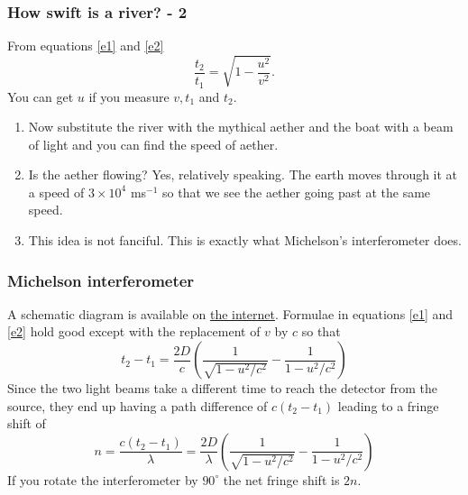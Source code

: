\documentclass{beamer}
\begin{document}
\begin{frame}
\frametitle{How swift is a river? - 2}
From equations \eqref{e1} and \eqref{e2}
\begin{equation}\label{e3}
\frac{t_2}{t_1} = \sqrt{1 - \frac{u^2}{v^2}}.
\end{equation}
You can get $u$ if you measure $v, t_1$ and $t_2$. 
\begin{enumerate}
\item Now substitute the river with the mythical aether and the boat with a 
beam of light and you can find the speed of aether.
\item Is the aether flowing? Yes, relatively speaking. The earth moves through
it at a speed of $3 \times 10^4$ ms${}^{-1}$ so that we see the aether going
past at the same speed.
\item This idea is not fanciful. This is exactly what Michelson's interferometer
does.
\end{enumerate}
\end{frame}

\begin{frame}
\frametitle{Michelson interferometer}
A schematic diagram is available on 
\href{https://en.wikipedia.org/wiki/Michelson_interferometer}{the internet}.
Formulae in equations \eqref{e1} and \eqref{e2} hold good except with the 
replacement of $v$ by $c$ so that
\begin{equation}\label{e4}
t_2 - t_1 = \frac{2D}{c}\left(\frac{1}{\sqrt{1 - u^2/c^2}} - 
                              \frac{1}{1-u^2/c^2}\right)
\end{equation}
Since the two light beams take a different time to reach the detector from the
source, they end up having a path difference of $c(t_2 - t_1)$ leading to a 
fringe shift of 
\begin{equation}\label{e5}
n = \frac{c(t_2 - t_1)}{\lambda} = 
  \frac{2D}{\lambda}\left(\frac{1}{\sqrt{1 - u^2/c^2}} - 
                          \frac{1}{1-u^2/c^2}\right)
\end{equation}
If you rotate the interferometer by $90^\circ$ the net fringe shift is $2n$.
\end{frame}
\end{document}

